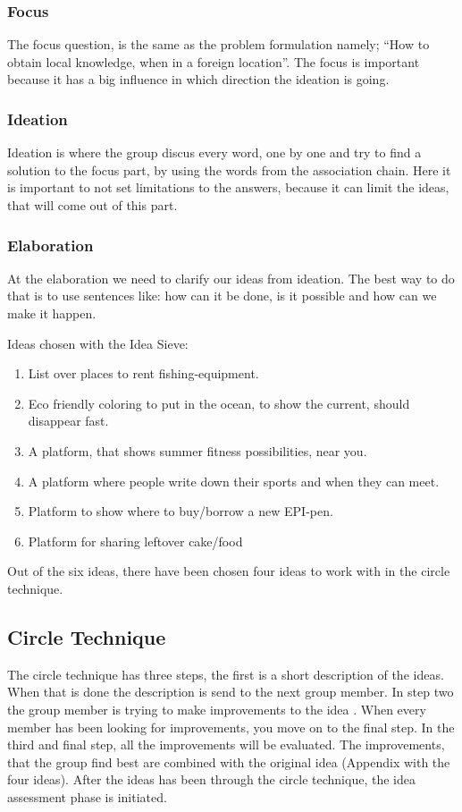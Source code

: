 \subsubsection{Focus}
The focus question, is the same as the problem formulation namely; “How to obtain local knowledge, when in a foreign location”. The focus is important because it has a big influence in which direction the ideation is going. 

\subsubsection{Ideation}
Ideation is where the group discus every word, one by one and try to find a solution to the focus part, by using the words from the association chain. Here it is important to not set limitations to the answers, because it can limit the ideas, that will come out of this part.
\newpage
\subsubsection{Elaboration}
At the elaboration we need to clarify our ideas from ideation. The best way to do that is to use sentences like: how can it be done, is it possible and how can we make it happen.

Ideas chosen with the Idea Sieve:
\begin{enumerate}
	\item List over places to rent fishing-equipment. 
	\item Eco friendly coloring to put in the ocean, to show the current, should disappear fast.
	\item A platform, that shows summer fitness possibilities, near you.
	\item A platform where people write down their sports and when they can meet.
	\item Platform to show where to buy/borrow a new EPI-pen.
	\item Platform for sharing leftover cake/food      
\end{enumerate}

Out of the six ideas,  there have been chosen four ideas to work with in the circle technique.

\subsection{Circle Technique}
The circle technique has three steps, the first is a short description of the ideas. When that is done the description is send to the next group member. In step two the group member is trying to make improvements to the idea . When every member has been looking for improvements, you move on to the final step. In the third and final step, all the improvements will be evaluated. The improvements, that the group find best are combined with the original idea (Appendix with the four ideas). After the ideas has been through the circle technique, the idea assessment phase is initiated. 

